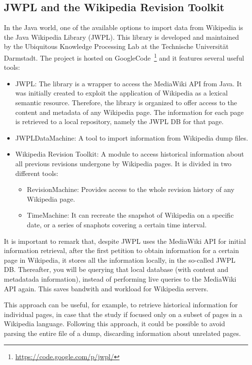 \subsection{JWPL and the Wikipedia Revision Toolkit}
In the Java world, one of the available options to import data from Wikipedia is 
the Java Wikipedia Library (JWPL). This library is developed and maintained by
the Ubiquitous Knowledge Processing Lab at the Technische Universität Darmstadt.
The project is hosted on GoogleCode~\footnote{\url{https://code.google.com/p/jwpl/}} and
it features several useful tools:

\begin{itemize}
 \item JWPL: The library is a wrapper to access the MediaWiki API from Java. It was
 initially created to exploit the application of Wikipedia as a lexical semantic
 resource. Therefore, the library is organized to offer access to the content and
 metadata of any Wikipedia page. The information for each page is retrieved to a local
 repository, namely the JWPL DB for that page.
 \item JWPLDataMachine: A tool to import information from Wikipedia dump files. 
 \item Wikipedia Revision Toolkit: A module to access historical information about
 all previous revisions undergone by Wikipedia pages. It is divided in two different
 tools:
 \begin{itemize}
  \item RevisionMachine: Provides access to the whole revision history of any
  Wikipedia page.
  \item TimeMachine: It can recreate the snapshot of Wikipedia on a specific date,
  or a series of snaphots covering a certain time interval.
 \end{itemize}
\end{itemize}

It is important to remark that, despite JWPL uses the MediaWiki API for initial
information retrieval, after the first petition to obtain information for a certain
page in Wikipedia, it stores all the information locally,
in the so-called JWPL DB. Thereafter, you will be querying that local database (with
content and metadatada information), instead of performing live queries to the 
MediaWiki API again. This saves bandwith and workload for Wikipedia servers. 

This approach can be useful, for example, to retrieve historical information for
individual pages, in case that the study if focused only on a subset of pages in
a Wikipedia language. Following this approach, it could be possible to avoid parsing
the entire file of a dump, discarding information about unrelated pages.

